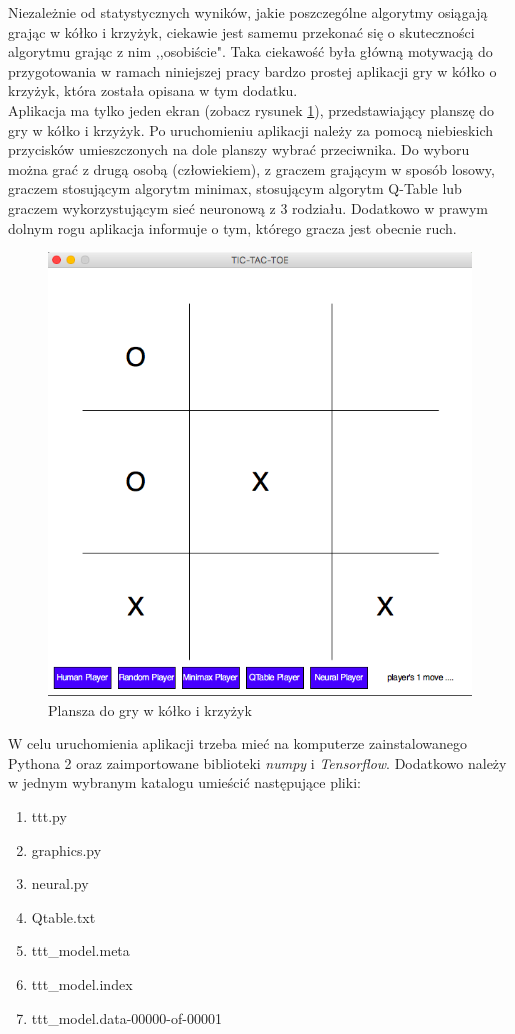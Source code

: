\documentclass[licencjacka]{pracamgr}
\begin{document}
Niezależnie od statystycznych wyników, jakie poszczególne algorytmy osiągają grając w kółko i krzyżyk, ciekawie jest samemu przekonać się o 
skuteczności algorytmu grając z nim ,,osobiście". Taka ciekawość była główną motywacją do przygotowania w ramach niniejszej pracy 
bardzo prostej aplikacji gry w kółko o krzyżyk, która została opisana w tym dodatku. \\

Aplikacja ma tylko jeden ekran (zobacz rysunek \ref{Rys34}), przedstawiający planszę do gry w kółko i krzyżyk. Po uruchomieniu aplikacji 
należy za pomocą niebieskich przycisków umieszczonych na dole planszy wybrać przeciwnika. Do wyboru można grać z drugą osobą (człowiekiem), 
z graczem grającym w sposób losowy,  graczem stosującym algorytm minimax, stosującym algorytm Q-Table lub graczem wykorzystującym sieć neuronową 
z 3 rodziału. Dodatkowo w prawym dolnym rogu aplikacja informuje o tym, którego gracza jest obecnie ruch.

\begin{figure}[h!]
	\includegraphics [scale=0.45] {plansza.png}
	\caption{Plansza do gry w kółko i krzyżyk}
	\label{Rys34}
\end{figure} 

W celu uruchomienia aplikacji trzeba mieć na komputerze zainstalowanego Pythona 2 oraz zaimportowane biblioteki \textit{numpy} i \textit{Tensorflow}. Dodatkowo należy w jednym wybranym katalogu umieścić następujące 
pliki:
\begin{enumerate}
	\item{ttt.py}
	\item{graphics.py}
	\item{neural.py}
	\item{Qtable.txt}
	\item{ttt\_model.meta}
	\item{ttt\_model.index}
	\item{ttt\_model.data-00000-of-00001}
\end{enumerate}
\end{document}
